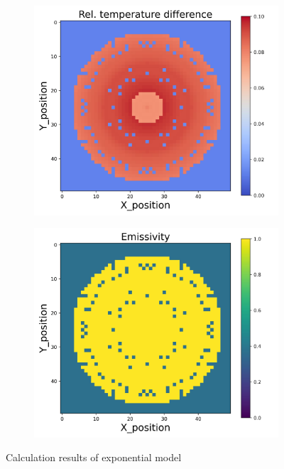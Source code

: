 \begin{figure}[htbp]
\begin{minipage}{\textwidth}
\begin{subfigure}{0.325\textwidth}
        \end{subfigure}
        \begin{subfigure}{0.325\textwidth}
            \centering
            \includegraphics[width=\textwidth]{figures/raw_data/5/exp/T_bias.jpg}
        \end{subfigure}
        \begin{subfigure}{0.325\textwidth}
            \centering
            \includegraphics[width=\textwidth]{figures/raw_data/5/exp/emi_cal.jpg}
        \end{subfigure}
    \end{minipage}
    \caption{Calculation results of exponential model}
    \label{fig: result_exponential_model}
\end{figure}


